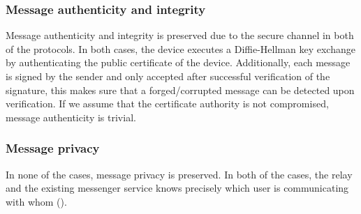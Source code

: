 \subsubsection{Message authenticity and integrity}

Message authenticity and integrity is preserved due to the secure channel in both of the protocols. In both cases, the \usb device executes a Diffie-Hellman key exchange by authenticating the public certificate of the device. Additionally, each message is signed by the sender and only accepted after successful verification of the signature, this makes sure that a forged/corrupted message can be detected upon verification. If we assume that the certificate authority is not compromised, message authenticity is trivial.

\subsubsection{Message privacy}
In none of the cases, message privacy is preserved. In both of the cases, the relay and the existing messenger service knows precisely which user is communicating with whom ().